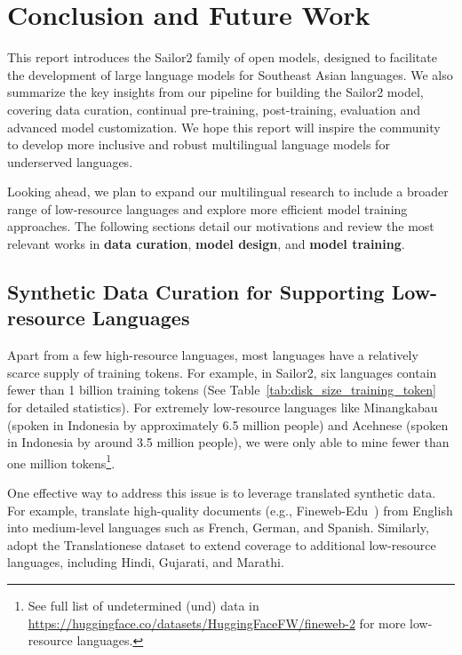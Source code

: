 \section{Conclusion and Future Work}

This report introduces the Sailor2 family of open models, designed to facilitate the development of large language models for Southeast Asian languages. 
We also summarize the key insights from our pipeline for building the Sailor2 model, covering data curation, continual pre-training, post-training, evaluation and advanced model customization. 
We hope this report will inspire the community to develop more inclusive and robust multilingual language models for underserved languages.

Looking ahead, we plan to expand our multilingual research to include a broader range of low-resource languages and explore more efficient model training approaches. 
The following sections detail our motivations and review the most relevant works in \textbf{data curation}, \textbf{model design}, and \textbf{model training}.

\subsection{Synthetic Data Curation for Supporting Low-resource Languages}
\label{sec:future_work_data_curation}

Apart from a few high-resource languages, most languages have a relatively scarce supply of training tokens. For example, in Sailor2, six languages contain fewer than 1 billion training tokens (See Table~\ref{tab:disk_size_training_token} for detailed statistics). 
For extremely low-resource languages like Minangkabau (spoken in Indonesia by approximately 6.5 million people) and Acehnese (spoken in Indonesia by around 3.5 million people), we were only able to mine fewer than one million tokens\footnote{See full list of undetermined (und) data in \url{https://huggingface.co/datasets/HuggingFaceFW/fineweb-2} for more low-resource languages.}. 

One effective way to address this issue is to leverage translated synthetic data. For example, \citet{Wang2024MultilingualPU} translate high-quality documents (e.g., Fineweb-Edu~\citep{lozhkov2024fineweb-edu}) from English into medium-level languages such as French, German, and Spanish. Similarly, \citet{doshi-etal-2024-pretraining} adopt the Translationese dataset to extend coverage to additional low-resource languages, including Hindi, Gujarati, and Marathi.





